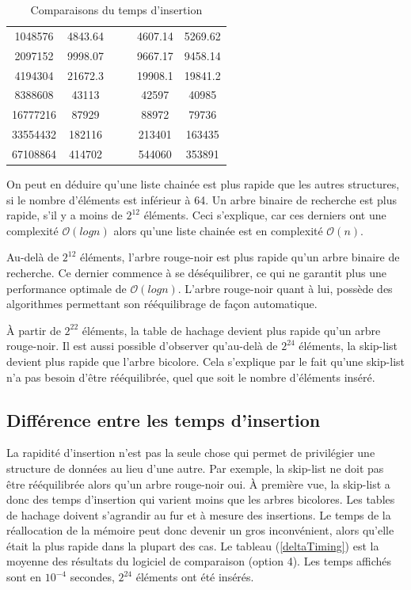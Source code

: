 \documentclass[hidelinks,a4paper, 12pt]{article}
\begin{document}
\begin{table}[h]
{\begin{tabular}{|S[table-format=8.0]|S[table-format=6.3]|S[table-format=6.3]|S[table-format=6.3]|S[table-format=6.3]|S[table-format=6.3]|}
				1048576 & 4843.64 &  &  & 4607.14  & 5269.62 \\
				2097152 & 9998.07 &  &  & 9667.17 & 9458.14 {} \\
				4194304 & 21672.3 &  &  & 19908.1 & 19841.2 {} \\
				8388608 & 43113 &  &  & 42597 & 40985 {} \\
				16777216 & 87929 &  &  & 88972 & 79736 {} \\
				33554432 & 182116 &  &  & 213401 & 163435 {} \\
				67108864 & 414702 &  &  & 544060 & 353891 {} \\
				\hline
			\end{tabular}
		}
		\caption{Comparaisons du temps d'insertion}
		\label{compareAllTiming}
	\end{table}
	On peut en déduire qu'une liste chainée est plus rapide que les autres structures, si le nombre d'éléments est inférieur à 64. Un arbre binaire de recherche est plus rapide, s'il y a moins de $2^{12}$ éléments. Ceci s'explique, car ces derniers ont une complexité $\mathcal{O}(log n)$ alors qu'une liste chainée est en complexité $\mathcal{O}(n)$.
	
	Au-delà de $2^{12}$ éléments, l'arbre rouge-noir est plus rapide qu'un arbre binaire de recherche. Ce dernier commence à se déséquilibrer, ce qui ne garantit plus une performance optimale de $\mathcal{O}(log n)$. L'arbre rouge-noir quant à lui, possède des algorithmes permettant son rééquilibrage de façon automatique.
	
	À partir de $2^{22}$ éléments, la table de hachage devient plus rapide qu'un arbre rouge-noir. Il est aussi possible d'observer qu'au-delà de $2^{24}$ éléments, la skip-list devient plus rapide que l'arbre bicolore. Cela s'explique par le fait qu'une skip-list n'a pas besoin d'être rééquilibrée, quel que soit le nombre d'éléments inséré.
	
	\subsection{Différence entre les temps d'insertion}
	La rapidité d'insertion n'est pas la seule chose qui permet de privilégier une structure de données au lieu d'une autre. Par exemple, la skip-list ne doit pas être rééquilibrée alors qu'un arbre rouge-noir oui. À première vue, la skip-list a donc des temps d'insertion qui varient moins que les arbres bicolores. Les tables de hachage doivent s'agrandir au fur et à mesure des insertions. Le temps de la réallocation de la mémoire peut donc devenir un gros inconvénient, alors qu'elle était la plus rapide dans la plupart des cas. Le tableau (\cref{deltaTiming}) est la moyenne des résultats du logiciel de comparaison (option 4). Les temps affichés sont en $10^{-4}$ secondes, $2^{24}$ éléments ont été insérés.
	
\end{document}

